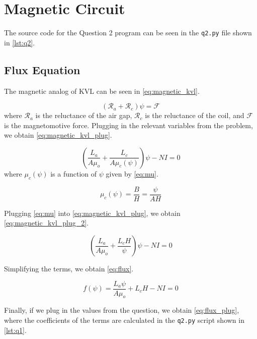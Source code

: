\documentclass[a4paper,titlepage]{article}
\begin{document}
	\section{Magnetic Circuit}
	The source code for the Question 2 program can be seen in the \texttt{q2.py} file shown in \cref{lst:q2}.
	
	\subsection{Flux Equation}
	The magnetic analog of KVL can be seen in \cref{eq:magnetic_kvl}.

	\begin{equation} \label{eq:magnetic_kvl}
		(\mathcal{R}_a + \mathcal{R}_c) \psi = \mathcal{F}
	\end{equation}
	where $\mathcal{R}_a$ is the reluctance of the air gap, $\mathcal{R}_c$ is the reluctance of the coil, and $\mathcal{F}$ is the magnetomotive force. Plugging in the relevant variables from the problem, we obtain \cref{eq:magnetic_kvl_plug}.

	\begin{equation} \label{eq:magnetic_kvl_plug}
		\left( \frac{L_a}{A \mu_o} + \frac{L_c}{A \mu_c(\psi)} \right) \psi - NI = 0
	\end{equation}
	where $\mu_c(\psi)$ is a function of $\psi$ given by \cref{eq:mu}.
	
	\begin{equation} \label{eq:mu}
		\mu_c(\psi) = \frac{B}{H} = \frac{\psi}{A H}
	\end{equation}
	
	Plugging \cref{eq:mu} into \cref{eq:magnetic_kvl_plug}, we obtain \cref{eq:magnetic_kvl_plug_2}.
	
	\begin{equation} \label{eq:magnetic_kvl_plug_2}
		\left( \frac{L_a}{A \mu_o} + \frac{L_c H}{\psi} \right) \psi - NI = 0
	\end{equation}
	
	Simplifying the terms, we obtain \cref{eq:flux}.
	
	\begin{equation} \label{eq:flux}
		f(\psi) = \frac{L_a \psi}{A \mu_o} + L_c H - NI = 0
	\end{equation}
	
	Finally, if we plug in the values from the question, we obtain \cref{eq:flux_plug}, where the coefficients of the terms are calculated in the \texttt{q2.py} script shown in \cref{lst:q1}.
	
\end{document}
